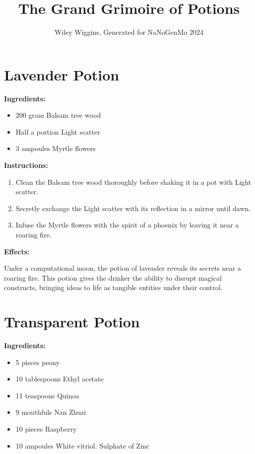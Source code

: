 \documentclass{article}
\title{The Grand Grimoire of Potions}
\author{Wiley Wiggins, Generated for NaNoGenMo 2024}
\date{}
\begin{document}
\maketitle

\newpage
\section*{Lavender Potion}

\textbf{Ingredients:}

\begin{itemize}
  \item 200 gram Balsam tree wood
  \item Half a portion Light scatter
  \item 3 ampoules Myrtle flowers
\end{itemize}

\textbf{Instructions:}

\begin{enumerate}
  \item Clean the Balsam tree wood thoroughly before shaking it in a pot with Light scatter.
  \item Secretly exchange the Light scatter with its reflection in a mirror until dawn.
  \item Infuse the Myrtle flowers with the spirit of a phoenix by leaving it near a roaring fire.
\end{enumerate}

\textbf{Effects:}

Under a computational moon, the potion of lavender reveals its secrets near a roaring fire. This potion gives the drinker the ability to disrupt magical constructs, bringing ideas to life as tangible entities under their control.

\newpage
\section*{Transparent Potion}

\textbf{Ingredients:}

\begin{itemize}
  \item 5 pieces peony
  \item 10 tablespoons Ethyl acetate
  \item 11 teaspoons Quinoa
  \item 9 mouthfuls Nan Zhuzi
  \item 10 pieces Raspberry
  \item 10 ampoules White vitriol. Sulphate of Zinc
\end{itemize}
\end{document}
